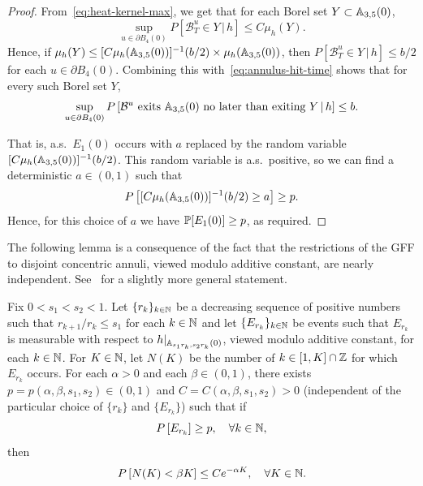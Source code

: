 \documentclass[12pt]{amsart}
\numberwithin{equation}{section}
\begin{document}
\begin{proof}
		From~\eqref{eq:heat-kernel-max}, we get that for each Borel set $Y \subset  \A_{3,5}(0)$, 
		\begin{equation}
		\label{eq:heat-kernel-int}
		\sup_{u\in \partial B_4(0)} P\left[ \mathcal B^u_{T} \in Y \,|\, h \right] \leq C \mu_h(Y) .
		\end{equation}
		Hence, if $\mu_h(Y) \leq [ C \mu_h(\A_{3,5}(0) ) ]^{-1} (b/2)  \times \mu_h(\A_{3,5}(0) )$, then $P\left[ \mathcal B^u_{T} \in Y \,|\, h \right] \leq b/2$ for each $u\in \partial B_4(0)$. Combining this with~\eqref{eq:annulus-hit-time} shows that for every such Borel set $Y$,
		\begin{equation}
		\sup_{u \in \partial B_4(0)}  P\left[ \text{$\mathcal B^u$ exits $\A_{3,5}(0)$ no later than exiting $Y$} \,|\, h \right] \leq b . %
		\end{equation}
		
		That is, a.s.\ $E_1(0)$ occurs with $a$ replaced by the random variable $[ C \mu_h(\A_{3,5}(0) ) ]^{-1} (b/2)$. This random variable is a.s.\ positive, so we can find a deterministic $a \in (0,1)$ such that 
		\begin{equation}
		P\left[ [ C \mu_h(\A_{3,5}(0) ) ]^{-1} (b/2) \geq a \right] \geq p . 
		\end{equation}
		Hence, for this choice of $a$ we have $\P[E_1(0)] \geq p$, as required.
	\end{proof}
	
	
	The following lemma is a consequence of the fact that the restrictions of the GFF to disjoint concentric annuli, viewed modulo additive constant, are nearly independent. See~\cite[Lemma 3.1]{gwynne2020local} for a slightly more general statement. 
	
	
	\begin{lemma} \label{lemma:annulus-iterate}
		Fix $0 < s_1<s_2 < 1$. Let $\{r_k\}_{k\in\N}$ be a decreasing sequence of positive numbers such that $r_{k+1} / r_k \leq s_1$ for each $k\in\N$ and let $\{E_{r_k} \}_{k\in\N}$ be events such that $E_{r_k}$ is measurable with respect to $h |_{\A_{s_1 r_k , s_2 r_k}(0)  } $, viewed modulo additive constant, for each $k\in\N$. 
		For $K\in\N$, let $N(K)$ be the number of $k\in [1,K] \cap \Z$ for which $E_{r_k}$ occurs. 
		For each $\alpha > 0$ and each $\beta \in (0,1)$, there exists $p = p(\alpha,\beta,s_1,s_2) \in (0,1)$ and $C = C(\alpha,\beta,s_1,s_2) > 0$ (independent of the particular choice of $\{r_k\}$ and $\{E_{r_k}\}$) such that if  
		\begin{equation} \label{eqn-annulus-iterate-prob}
		P\left[ E_{r_k}  \right] \geq p , \quad \forall k\in\N  ,
		\end{equation} 
		then 
		\begin{equation} \label{eqn-annulus-iterate}
		P\left[ N(K)  < \beta K\right] \leq C e^{-\alpha K} ,\quad\forall K \in \N. 
		\end{equation}  
	\end{lemma}
	
\end{document}

